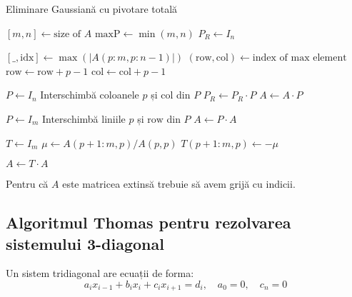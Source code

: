 \documentclass{exam}
\newcommand{\octavescript}[2]{
	
}
\begin{document}
\begin{algorithm}
	\caption{Eliminare Gaussiană cu pivotare totală}
	\begin{algorithmic}[1]
		\State \( [m, n] \gets \text{size of } A \)
		\State \( \text{maxP} \gets \min(m, n) \) 
		\State \( P_R \gets I_n \) 

		\State \( [\_, \text{idx}] \gets \max(|A(p:m, p:n-1)|) \) 
		\State \( (\text{row}, \text{col}) \gets \text{index of max element} \) 
		\State \( \text{row} \gets \text{row} + p - 1 \)
		\State \( \text{col} \gets \text{col} + p - 1 \)

		\State \( P \gets I_n \) 
		\State Interschimbă coloanele \( p \) și \( \text{col} \) din \( P \)
		\State \( P_R \gets P_R \cdot P \) 
		\State \( A \gets A \cdot P \) 

		\State \( P \gets I_m \) 
		\State Interschimbă liniile \( p \) și \( \text{row} \) din \( P \)
		\State \( A \gets P \cdot A \) 

		\State \( T \gets I_m \) 
		\State \( \mu \gets A(p+1:m, p) / A(p, p) \) 
		\State \( T(p+1:m, p) \gets -\mu \) 

		\State \( A \gets T \cdot A \) 
		\EndFor
	\end{algorithmic}
\end{algorithm}

Pentru că $A$ este matricea extinsă trebuie să avem grijă cu indicii.

\subsection{Algoritmul Thomas pentru rezolvarea sistemului 3-diagonal}

Un sistem tridiagonal are ecuații de forma:
\begin{equation*}
	a_i x_{i - 1} + b_i x_i + c_i x_{i + 1} = d_i, \quad a_0 = 0, \quad c_n = 0
\end{equation*}
\end{document}
